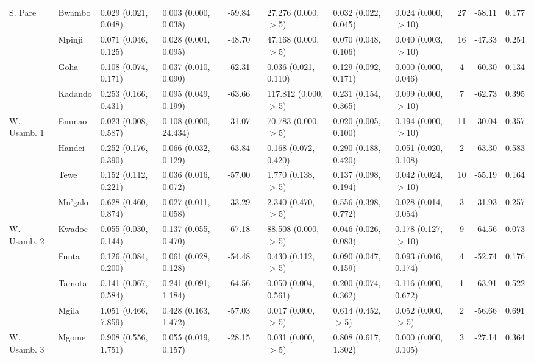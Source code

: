 \begin{tabular}{lllllllllclr}
\cmidrule{2-12}
S. Pare     & Bwambo         & 0.029 (0.021, 0.048)   & 0.003 (0.000, 0.038)   & -59.84   & & 27.276 (0.000, $>$5) & 0.032 (0.022, 0.045)   & 0.024 (0.000, $>$10)   & 27  & -58.11   & 0.177 \\
            & Mpinji         & 0.071 (0.046, 0.125)   & 0.028 (0.001, 0.095)   & -48.70   & & 47.168 (0.000, $>$5) & 0.070 (0.048, 0.106)   & 0.040 (0.003, $>$10)   & 16  & -47.33   & 0.254 \\
            & Goha           & 0.108 (0.074, 0.171)   & 0.037 (0.010, 0.090)   & -62.31   & & 0.036 (0.021, 0.110) & 0.129 (0.092, 0.171)   & 0.000 (0.000, 0.046)   & 4   & -60.30   & 0.134 \\
            & Kadando        & 0.253 (0.166, 0.431)   & 0.095 (0.049, 0.199)   & -63.66   & & 117.812 (0.000, $>$5)& 0.231 (0.154, 0.365)   & 0.099 (0.000, $>$10)   & 7   & -62.73   & 0.395 \\
\cmidrule{2-12}
W. Usamb. 1 & Emmao          & 0.023 (0.008, 0.587)   & 0.108 (0.000, 24.434)  & -31.07   & & 70.783 (0.000, $>$5) & 0.020 (0.005, 0.100)   & 0.194 (0.000, $>$10)   & 11  & -30.04   & 0.357 \\
            & Handei         & 0.252 (0.176, 0.390)   & 0.066 (0.032, 0.129)   & -63.84   & & 0.168 (0.072, 0.420) & 0.290 (0.188, 0.420)   & 0.051 (0.020, 0.108)   & 2   & -63.30   & 0.583 \\
            & Tewe           & 0.152 (0.112, 0.221)   & 0.036 (0.016, 0.072)   & -57.00   & & 1.770 (0.138, $>$5)  & 0.137 (0.098, 0.194)   & 0.042 (0.024, $>$10)   & 10  & -55.19   & 0.164 \\
            & Mn'galo        & 0.628 (0.460, 0.874)   & 0.027 (0.011, 0.058)   & -33.29   & & 2.340 (0.470, $>$5)  & 0.556 (0.398, 0.772)   & 0.028 (0.014, 0.054)   & 3   & -31.93   & 0.257 \\
\cmidrule{2-12}
W. Usamb. 2 & Kwadoe         & 0.055 (0.030, 0.144)   & 0.137 (0.055, 0.470)   & -67.18   & & 88.508 (0.000, $>$5) & 0.046 (0.026, 0.083)   & 0.178 (0.127, $>$10)   & 9   & -64.56   & 0.073 \\
            & Funta          & 0.126 (0.084, 0.200)   & 0.061 (0.028, 0.128)   & -54.48   & & 0.430 (0.112, $>$5)  & 0.090 (0.047, 0.159)   & 0.093 (0.046, 0.174)   & 4   & -52.74   & 0.176 \\
            & Tamota         & 0.141 (0.067, 0.584)   & 0.241 (0.091, 1.184)   & -64.56   & & 0.050 (0.004, 0.561) & 0.200 (0.074, 0.362)   & 0.116 (0.000, 0.672)   & 1   & -63.91   & 0.522 \\
            & Mgila          & 1.051 (0.466, 7.859)   & 0.428 (0.163, 1.472)   & -57.03   & & 0.017 (0.000, $>$5)  & 0.614 (0.452, $>$5)    & 0.052 (0.000, $>$5)    & 2   & -56.66   & 0.691 \\
\cmidrule{2-12}
W. Usamb. 3 & Mgome          & 0.908 (0.556, 1.751)   & 0.055 (0.019, 0.157)   & -28.15   & & 0.031 (0.000, $>$5)  & 0.808 (0.617, 1.302)   & 0.000 (0.000, 0.105)   & 3   & -27.14   & 0.364 \\
\bottomrule
\end{tabular}